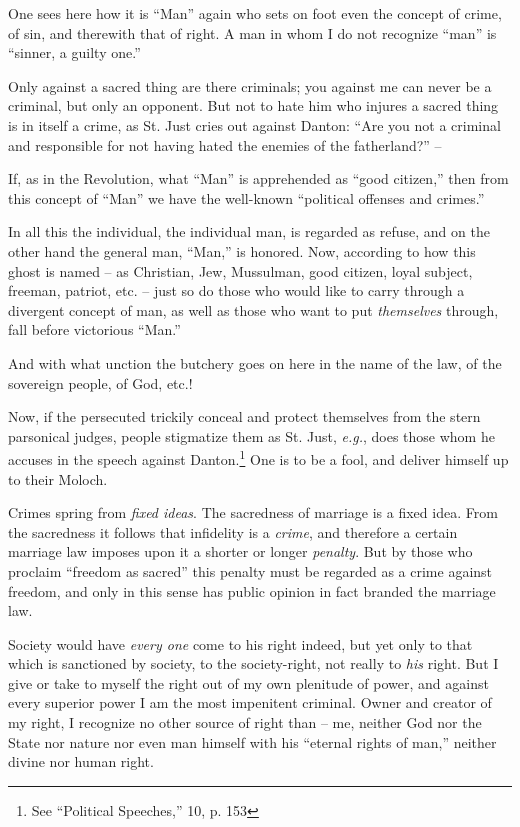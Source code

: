 \documentclass[12pt,a4paper]{book}
\begin{document}
One sees here how it is ``Man'' again who sets on foot even the concept of 
crime, of sin, and therewith that of right. A man in whom I do not recognize 
``man'' is ``sinner, a guilty one.''

Only against a sacred thing are there criminals; you against me can never be a 
criminal, but only an opponent. But not to hate him who injures a sacred thing 
is in itself a crime, as St. Just cries out against Danton: ``Are you not a 
criminal and responsible for not having hated the enemies of the 
fatherland?'' --

If, as in the Revolution, what ``Man'' is apprehended as ``good citizen,'' 
then from this concept of ``Man'' we have the well-known ``political 
offenses and crimes.''

In all this the individual, the individual man, is regarded as refuse, and on 
the other hand the general man, ``Man,'' is honored. Now, according to how 
this ghost is named -- as Christian, Jew, Mussulman, good citizen, loyal 
subject, freeman, patriot, etc. -- just so do those who would like to carry 
through a divergent concept of man, as well as those who want to put 
\textit{themselves} through, fall before victorious ``Man.''

And with what unction the butchery goes on here in the name of the law, of the 
sovereign people, of God, etc.!

Now, if the persecuted trickily conceal and protect themselves from the stern 
parsonical judges, people stigmatize them as St. Just, \textit{e.g.}, does 
those whom he accuses in the speech against Danton.\footnote{See ``Political 
Speeches,'' 10, p. 153} One is to be a fool, and deliver himself up to their 
Moloch.

Crimes spring from \textit{fixed ideas}. The sacredness of marriage is a fixed 
idea. From the sacredness it follows that infidelity is a \textit{crime}, and 
therefore a certain marriage law imposes upon it a shorter or longer 
\textit{penalty}. But by those who proclaim ``freedom as sacred'' this 
penalty must be regarded as a crime against freedom, and only in this sense 
has public opinion in fact branded the marriage law.

Society would have \textit{every one} come to his right indeed, but yet only 
to that which is sanctioned by society, to the society-right, not really to 
\textit{his} right. But I give or take to myself the right out of my own 
plenitude of power, and against every superior power I am the most impenitent 
criminal. Owner and creator of my right, I recognize no other source of right 
than -- me, neither God nor the State nor nature nor even man himself with his 
``eternal rights of man,'' neither divine nor human right.
\end{document}
